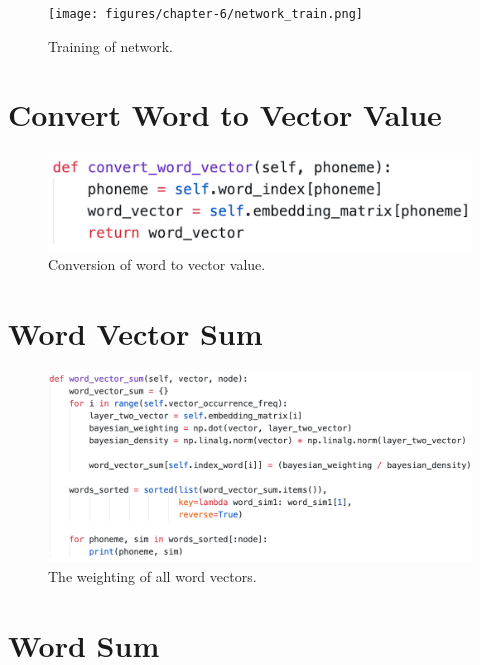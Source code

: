 \begin{figure}[H]
    \centering
    \texttt{[image: figures/chapter-6/network\_train.png]}
    \caption[Training of network]{Training of network.
    \label{fig:network_train}}
\end{figure}

\section{Convert Word to Vector Value}

\begin{figure}[H]
    \centering
    \includegraphics[width=\textwidth]{figures/chapter-6/convertwordvector.png}
    \caption[Conversion of word to vector value]{Conversion of word to vector value.
    \label{fig:convertwordvector}}
\end{figure}

\section{Word Vector Sum}

\begin{figure}[H]
    \centering
    \includegraphics[width=\textwidth]{figures/chapter-6/wordvectorsum.png}
    \caption[The weighting of all word vectors]{The weighting of all word vectors.
    \label{fig:wordvectorsum}}
\end{figure}

\section{Word Sum}

